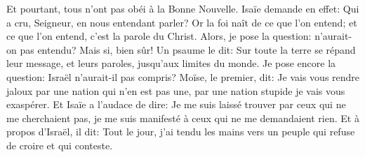 Et pourtant, tous n’ont pas obéi à la Bonne Nouvelle.
Isaïe demande en effet:
	Qui a cru, Seigneur, en nous entendant parler?
Or la foi naît de ce que l’on entend;
	et ce que l’on entend, c’est la parole du Christ.
Alors, je pose la question:
	n’aurait-on pas entendu?
	Mais si, bien sûr!
Un psaume le dit:
	Sur toute la terre se répand leur message,
	et leurs paroles, jusqu’aux limites du monde.
Je pose encore la question:
	Israël n’aurait-il pas compris?
	Moïse, le premier, dit:
	Je vais vous rendre jaloux par une nation qui n’en est pas une,
	par une nation stupide je vais vous exaspérer.
Et Isaïe a l’audace de dire:
	Je me suis laissé trouver par ceux qui ne me cherchaient pas,
	je me suis manifesté à ceux qui ne me demandaient rien.
Et à propos d’Israël, il dit:
	Tout le jour, j’ai tendu les mains
		vers un peuple qui refuse de croire et qui conteste.
